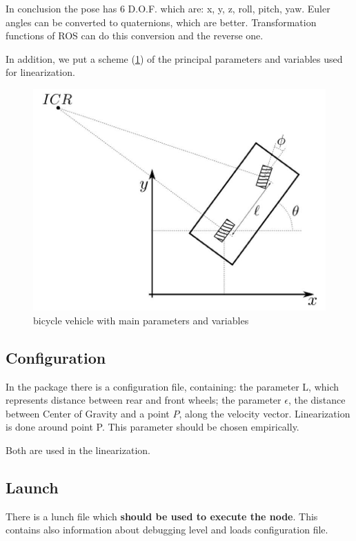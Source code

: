 \documentclass[12pt, letterpaper]{report}
\begin{document}
In conclusion the pose has 6 D.O.F. which are: x, y, z, roll, pitch, yaw. Euler angles can be converted to quaternions, which are better. Transformation functions of ROS can do this conversion and the reverse one.

In addition, we put a scheme (\ref{fig:bicycle_vehicle}) of the principal parameters and variables  used for linearization.

\begin{figure}[h]
	\includegraphics[scale=0.4]{kinematic_model}
	\caption{bicycle vehicle with main parameters and variables}
	\label{fig:bicycle_vehicle}
\end{figure}

\subsection{Configuration}

In the package there is a configuration file, containing: the parameter L, which represents distance between rear and front wheels; the parameter $\epsilon$, the distance between Center of Gravity and a point $P$, along the velocity vector. Linearization is done around point P. This parameter should be chosen empirically.
 
Both are used in the linearization.

\subsection{Launch}

There is a lunch file which \textbf{should be used to execute the node}. This contains also information about debugging level and loads configuration file.
\end{document}

